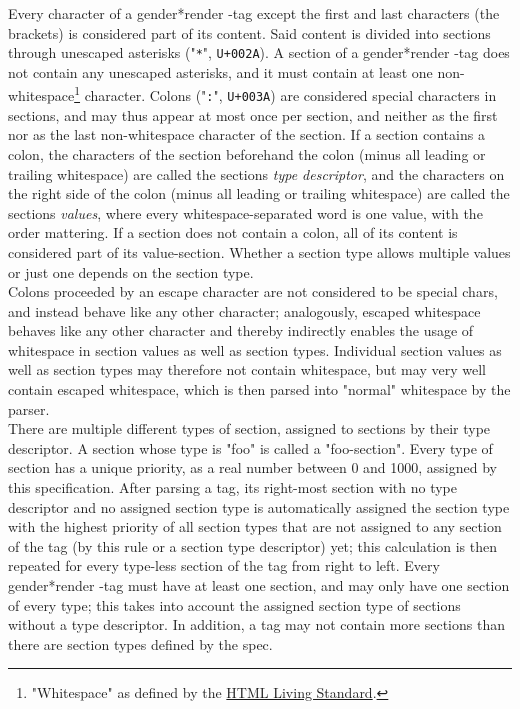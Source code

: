 \documentclass{article}
\newcommand{\GenderRender}{
    gender*render
}
\begin{document}
    Every character of a \GenderRender-tag except the first and last characters (the brackets) is considered part of its content.
    Said content is divided into sections through unescaped asterisks ("\texttt{*}", \texttt{U+002A}).
    A section of a \GenderRender-tag does not contain any unescaped asterisks, and it must contain at least one non-whitespace\footnote{"Whitespace" as defined by the \href{https://infra.spec.whatwg.org/\#ascii-whitespace}{HTML Living Standard}.} character.
    Colons ("\texttt{:}", \texttt{U+003A}) are considered special characters in sections, and may thus appear at most once per section, and neither as the first nor as the last non-whitespace  character of the section.
    If a section contains a colon, the characters of the section beforehand the colon (minus all leading or trailing whitespace) are called the sections \emph{type descriptor}, and the characters on the right side of the colon (minus all leading or trailing whitespace) are called the sections \emph{values},
    where every whitespace-separated word is one value, with the order mattering.
    If a section does not contain a colon, all of its content is considered part of its value-section.
    Whether a section type allows multiple values or just one depends on the section type.\\

    Colons proceeded by an escape character are not considered to be special chars, and instead behave like any other character;
    analogously, escaped whitespace behaves like any other character and thereby indirectly enables the usage of whitespace in section values as well as section types.
    Individual section values as well as section types may therefore not contain whitespace, but may very well contain escaped whitespace, which is then parsed into "normal" whitespace by the parser.\\

    There are multiple different types of section, assigned to sections by their type descriptor.
    A section whose type is "foo" is called a "foo-section".
    Every type of section has a unique priority, as a real number between 0 and 1000, assigned by this specification.
    After parsing a tag, its right-most section with no type descriptor and no assigned section type is automatically assigned the section type with the highest priority of all section types that are not assigned to any section of the tag (by this rule or a section type descriptor) yet;
    this calculation is then repeated for every type-less section of the tag from right to left.
    Every \GenderRender-tag must have at least one section, and may only have one section of every type;
    this takes into account the assigned section type of sections without a type descriptor.
    In addition, a tag may not contain more sections than there are section types defined by the spec.\\
\end{document}
